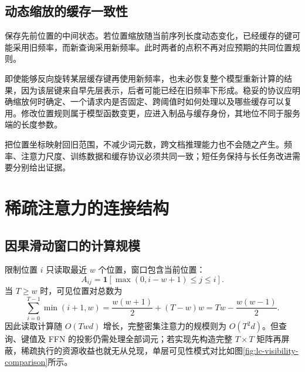 \documentclass[../textbook.tex]{subfiles}
\begin{document}
\subsection{动态缩放的缓存一致性}
保存先前位置的中间状态。若位置缩放随当前序列长度动态变化，已经缓存的键可能采用旧频率，而新查询采用新频率。此时两者的点积不再对应预期的共同位置规则。

即使能够反向旋转某层缓存键再使用新频率，也未必恢复整个模型重新计算的结果，因为该层键来自早先层表示，后者可能已经在旧频率下形成。稳妥的协议应明确缩放何时确定、一个请求内是否固定、跨阈值时如何处理以及哪些缓存可以复用。修改位置规则属于模型函数变更，应进入制品与缓存身份，其地位不同于服务端的长度参数。

\begin{note}[位置扩展的必要边界]
把位置坐标映射回旧范围，不减少词元数，跨文档推理能力也不会随之产生。频率、注意力尺度、训练数据和缓存协议必须共同一致；短任务保持与长任务改进需要分别给出证据。
\end{note}

\section{稀疏注意力的连接结构}

\subsection{因果滑动窗口的计算规模}
限制位置 $i$ 只读取最近 $w$ 个位置，窗口包含当前位置：
\begin{equation}\label{eq:lc-window}
 A_{ij}=\mathbf1[\max(0,i-w+1)\le j\le i].
\end{equation}
当 $T\ge w$ 时，可见位置对总数为
\begin{equation}
 \sum_{i=0}^{T-1}\min(i+1,w)
 =\frac{w(w+1)}2+(T-w)w
 =Tw-\frac{w(w-1)}2.
\end{equation}
因此读取计算随 $O(Twd)$ 增长，完整密集注意力的规模则为 $O(T^2d)$。但查询、键值及 FFN 的投影仍需处理全部词元；若实现先构造完整 $T\times T$ 矩阵再屏蔽，稀疏执行的资源收益也就无从兑现，单层可见性模式对比如图\ref{fig:lc-visibility-comparison}所示。
\end{document}
